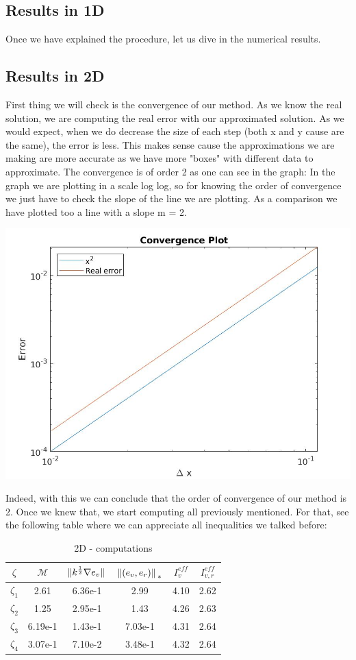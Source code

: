 \documentclass{article}
\begin{document}
    \subsection*{Results in 1D}
    Once we have explained the procedure, let us dive in the numerical results.

    \subsection*{Results in 2D}
    First thing we will check is the convergence of our method. As we know the real solution, we are computing the real error with our approximated solution. As we would expect, when we do decrease the size of each step (both x and y cause are the same), the error is less. This makes sense cause the approximations we are making are more accurate as we have more "boxes" with different data to approximate. The convergence is of order 2 as one can see in the graph:
    In the graph we are plotting in a scale log log, so for knowing the order of convergence we just have to check the slope of the line we are plotting. As a comparison we have plotted too a line with a slope m = 2.
    \begin{center}
        \includegraphics[width = 0.7\linewidth]{../Images/convergence2d.jpg}
    \end{center}

    Indeed, with this we can conclude that the order of convergence of our method is 2. Once we knew that, we start computing all previously mentioned. For that, see the following table where we can appreciate all inequalities we talked before:
    \begin{table}[h!]
        \centering
        \begin{tabular}{c | c | c | c | c | c }
            $\zeta$ & $\mathcal{M}$  & $\norm*{k^{\frac{1}{2}}\nabla e_v}$ & $\norm*{(e_v,e_r)}_{*}$ & $I_v^{eff}$ & $I_{v,r}^{eff}$ \\
            \hline \hline
            $\zeta_1$ & 2.61 & 6.36e-1 & 2.99 & 4.10 & 2.62 \\ 
            $\zeta_2$ & 1.25 & 2.95e-1 & 1.43 & 4.26 & 2.63 \\
            $\zeta_3$ & 6.19e-1 & 1.43e-1& 7.03e-1 & 4.31 & 2.64 \\
            $\zeta_4$ & 3.07e-1 & 7.10e-2 & 3.48e-1 & 4.32 & 2.64 \\
        \end{tabular}
        \caption{2D - computations}
    \end{table}
    
\end{document}
